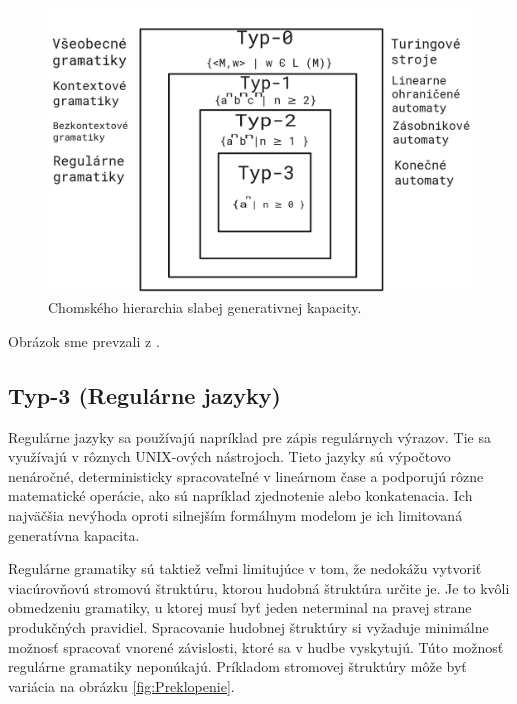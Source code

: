 \begin{figure}[H]
    \centering
    \includegraphics[scale=0.3]{obrazky-figures/ChomHier.png}
    \caption{Chomského hierarchia slabej generativnej kapacity.}
    \label{fig:chomhier}
\end{figure}

Obrázok sme prevzali z \cite{musicformallang}.

\subsection*{Typ-3 (Regulárne jazyky)}
Regulárne jazyky sa používajú napríklad pre zápis regulárnych výrazov. Tie sa využívajú v rôznych UNIX-ových nástrojoch. Tieto jazyky sú výpočtovo nenáročné, deterministicky spracovateľné v lineárnom čase a podporujú rôzne matematické operácie, ako sú napríklad zjednotenie alebo konkatenacia. Ich najväčšia nevýhoda oproti silnejším formálnym modelom je ich limitovaná generatívna kapacita.

Regulárne gramatiky sú taktiež veľmi limitujúce v tom, že nedokážu vytvoriť viacúrovňovú stromovú štruktúru, ktorou hudobná štruktúra určite je. Je to kvôli obmedzeniu gramatiky, u ktorej musí byť jeden neterminal na pravej strane produkčných pravidiel. Spracovanie hudobnej štruktúry si vyžaduje minimálne možnosť spracovať vnorené závislosti, ktoré sa v hudbe vyskytujú. Túto možnosť regulárne gramatiky neponúkajú. Príkladom stromovej štruktúry môže byť variácia na obrázku \ref{fig:Preklopenie}.

